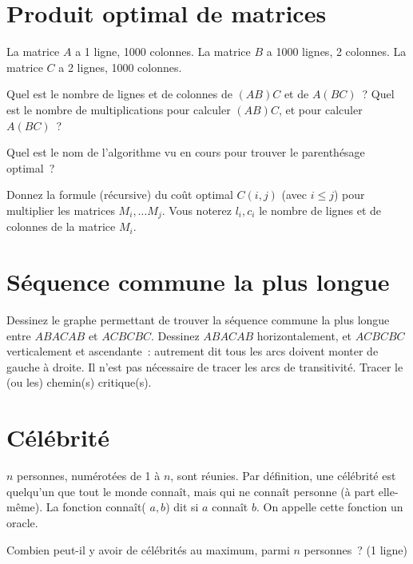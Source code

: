 \documentclass[11pt]{article}
\begin{document}
\section{Produit optimal de matrices}
La matrice $A$ a 1 ligne, 1000 colonnes.
La matrice $B$ a 1000 lignes, 2 colonnes.
La matrice $C$ a 2 lignes, 1000 colonnes.

Quel est le nombre de lignes et de colonnes de $(AB)C$ et de $A(BC)$~?
Quel est le nombre de multiplications pour calculer $(AB)C$, et pour calculer $A(BC)$~?

Quel est le nom de l'algorithme vu en cours pour trouver le parenthésage optimal~?


Donnez la formule (récursive) du coût optimal $C(i, j)$ (avec $i\le j$) pour multiplier les matrices
$M_i, \ldots M_j$. Vous noterez $l_i, c_i$ le nombre de lignes et de colonnes de la matrice $M_i$.

\else\fi
\section{Séquence commune la plus longue}
Dessinez le graphe permettant de trouver la séquence commune la plus longue
entre $ABACAB$ et $ACBCBC$. Dessinez $ABACAB$ horizontalement, et  $ACBCBC$ verticalement et ascendante~: autrement dit tous les arcs doivent monter de gauche à droite. Il n'est pas nécessaire de tracer les arcs de transitivité. Tracer le (ou les) chemin(s) critique(s).
 
\section{Célébrité}
$n$ personnes, numérotées de 1 à $n$, sont réunies. Par définition, une célébrité est quelqu'un que tout le monde connaît, mais qui ne connaît personne (à part elle-même). La fonction connaît( $a, b$) dit si $a$ connaît $b$. 
On appelle cette fonction un oracle.

Combien peut-il y avoir de célébrités au maximum, parmi $n$ personnes~? (1 ligne)

\else\fi
\end{document}

